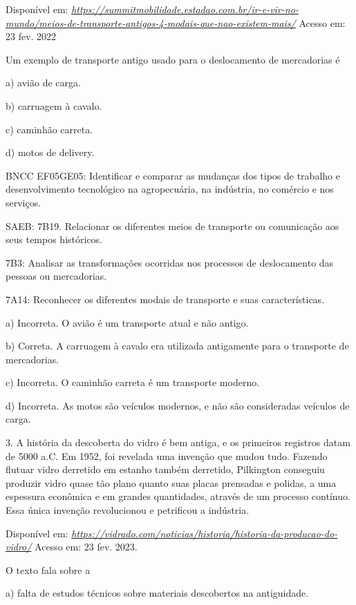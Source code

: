 Disponível em:
\href{https://summitmobilidade.estadao.com.br/ir-e-vir-no-mundo/meios-de-transporte-antigos-4-modais-que-nao-existem-mais/}{\emph{https://summitmobilidade.estadao.com.br/ir-e-vir-no-mundo/meios-de-transporte-antigos-4-modais-que-nao-existem-mais/}}
Acesso em: 23 fev. 2022

Um exemplo de transporte antigo usado para o deslocamento de mercadorias
é

a) avião de carga.

b) carruagem à cavalo.

c) caminhão carreta.

d) motos de delivery.

BNCC EF05GE05: Identificar e comparar as mudanças dos tipos de trabalho
e desenvolvimento tecnológico na agropecuária, na indústria, no comércio
e nos serviços.

SAEB: 7B19. Relacionar os diferentes meios de transporte ou comunicação
aos seus tempos históricos.

7B3: Analisar as transformações ocorridas nos processos de deslocamento
das pessoas ou mercadorias.

7A14: Reconhecer os diferentes modais de transporte e suas
características.

a) Incorreta. O avião é um transporte atual e não antigo.

b) Correta. A carruagem à cavalo era utilizada antigamente para o
transporte de mercadorias.

c) Incorreta. O caminhão carreta é um transporte moderno.

d) Incorreta. As motos são veículos modernos, e não são consideradas
veículos de carga.

3. A história da descoberta do vidro é bem antiga, e os primeiros
registros datam de 5000 a.C. Em 1952, foi revelada uma invenção que
mudou tudo. Fazendo flutuar vidro derretido em estanho também derretido,
Pilkington conseguiu produzir vidro quase tão plano quanto suas placas
prensadas e polidas, a uma espessura econômica e em grandes quantidades,
através de um processo contínuo. Essa única invenção revolucionou e
petrificou a indústria.

Disponível em:
\href{https://vidrado.com/noticias/historia/historia-da-producao-do-vidro/}{\emph{https://vidrado.com/noticias/historia/historia-da-producao-do-vidro/}}
Acesso em: 23 fev. 2023.

O texto fala sobre a

a) falta de estudos técnicos sobre materiais descobertos na antiguidade.

